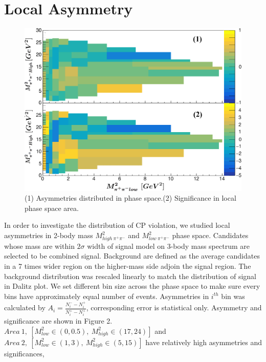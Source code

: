 \documentclass[12pt, twoside, notitlepage, twocolumn]{article}
\begin{document}
        \section{Local Asymmetry}
        \begin{figure}[b]
            \begin{centering}
            \includegraphics[scale=0.53]{LocalAS.png}
            \caption{(1) Asymmetries distributed in phase space.\newline (2) Significance in local phase space area.}
            \end{centering}
            \label{fig:label2}
        \end{figure}
        In order to investigate the distribution of CP violation, we studied local asymmetries in 
        2-body mass $M_{high\ \pi^+\pi^-}^2$ and $M_{low\ \pi^+\pi^-}^2$ phase space. Candidates whose
        mass are within $2\sigma$ width of signal model on 3-body mass spectrum are selected to be 
        combined signal. Background are defined as the average candidates in a 7 times wider region on 
        the higher-mass side adjoin the signal region. The background distribution was rescaled linearly 
        to match the distribution of signal in Dalitz plot. We set different bin size across the phase space
        to make sure every bins have approximately equal number of events. Asymmetries in $i^{th}$ 
        bin was calculated by $A_i=\frac{N^-_i-N^+_i}{N^+_i-N^+_i}$, corresponding error is statistical only.
        Asymmetry and significance are shown in Figure 2.
        $Area\ 1,\ [M^2_{low} \in (0,0.5),\ M^2_{high}\in(17,24)]$ and 
        $Area\ 2,\ [M^2_{low} \in (1,3),\ M^2_{high}\in(5,15)]$ have relatively high asymmetries and significances, 
\end{document}

